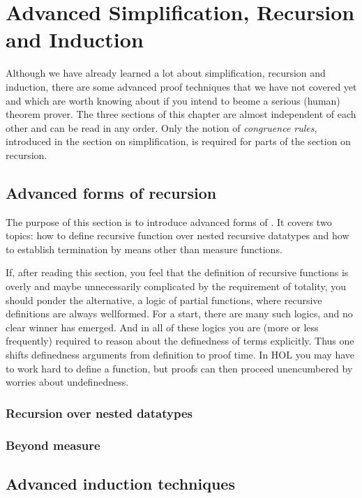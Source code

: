 \chapter{Advanced Simplification, Recursion and Induction}

Although we have already learned a lot about simplification, recursion and
induction, there are some advanced proof techniques that we have not covered
yet and which are worth knowing about if you intend to beome a serious
(human) theorem prover. The three sections of this chapter are almost
independent of each other and can be read in any order. Only the notion of
\emph{congruence rules}, introduced in the section on simplification, is
required for parts of the section on recursion.



\section{Advanced forms of recursion}

The purpose of this section is to introduce advanced forms of . It
covers two topics: how to define recursive function over nested recursive datatypes
and how to establish termination by means other than measure functions.

If, after reading this section, you feel that the definition of recursive
functions is overly and maybe unnecessarily complicated by the requirement of
totality, you should ponder the alternative, a logic of partial functions,
where recursive definitions are always wellformed. For a start, there are many
such logics, and no clear winner has emerged. And in all of these logics you
are (more or less frequently) required to reason about the definedness of
terms explicitly. Thus one shifts definedness arguments from definition to
proof time. In HOL you may have to work hard to define a function, but proofs
can then proceed unencumbered by worries about undefinedness.

\subsection{Recursion over nested datatypes}
\label{sec:nested-recdef}




\subsection{Beyond measure}
\label{sec:wellfounded}


\section{Advanced induction techniques}
\label{sec:advanced-ind}


